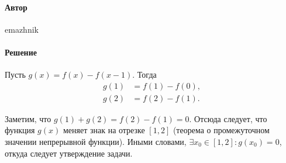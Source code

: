 \documentclass{article}
\begin{document}
\paragraph{Автор} emazhnik
\paragraph{Решение} Пусть $g(x) = f(x) - f(x-1)$. Тогда
\begin{align*}
g(1) &= f(1) - f(0), \\
g(2) &= f(2) - f(1).
\end{align*}

Заметим, что $g(1) + g(2) = f(2) - f(1) = 0$. Отсюда следует, что функция $g(x)$ меняет знак на отрезке $[1,2]$ (теорема о промежуточном значении непрерывной функции).
Иными словами, $\exists x_0 \in [1,2]: g(x_0)=0$, откуда следует утверждение задачи.
\end{document}

